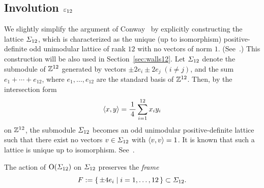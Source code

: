 \documentclass{amsart} %
\begin{document}
\subsection{Involution $\varepsilon_{12}$}\label{subsec:vep12}
%
We slightly simplify the argument of Conway~\cite[Chapter~10, Section~3.3]{theCSbook} 
by explicitly constructing the lattice $\varSigma_{12}$,
which is characterized as the unique (up to isomorphism) positive-definite odd unimodular lattice of rank $12$ 
with no vectors of norm $1$. (See~\cite[Chapter 16]{theCSbook}.)
This construction will be also used in Section~\ref{sec:walls12}.
Let $\varSigma_{12}$ denote the submodule of $\mathord{\mathbb{Z}}^{12}$ generated by vectors 
$\pm 2 e_i\pm 2 e_j\; (i\ne j)$, 
and the sum $e_1+\cdots+e_{12}$,
where $e_1,\dots, e_{12}$ are the standard basis of $\mathord{\mathbb{Z}}^{12}$.
Then, by the intersection form 
\[
\langle x, y \rangle=\frac{1}{\,4\,} \sum_{i=1}^{12} x_i y_i
\]
on $\mathord{\mathbb{Z}}^{12}$, the submodule $\varSigma_{12}$ becomes an odd unimodular
positive-definite lattice 
such that there exist no vectors $v\in \varSigma_{12}$ with $\langle v, v \rangle=1$.
It is known that such a lattice is unique up to isomorphism. 
See~\cite[Table 16.7]{theCSbook}.
%
\begin{lemma}\label{lem:frame}
The action of $\mathord{\mathrm{O}}(\varSigma_{12})$ on $\varSigma_{12}$ preserves
the \emph{frame}
\[
F:=\{\,{\pm 4 e_i}\mid {i=1, \dots, 12} \,\}\subset \varSigma_{12}.
\]
\end{lemma}
%
\end{document}
